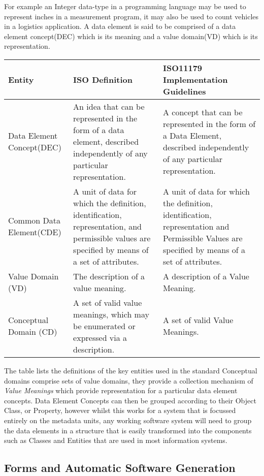 For example an Integer data-type in a programming language may be used
to represent inches in a measurement program, it may also be used to
count vehicles in a logistics application.  A data element is said to
be comprised of a data element concept(DEC) which is its meaning and a
value domain(VD) which is its representation.

\begin{table}[h]
  \begin{tabular}{ p{1.8cm} p{2.8cm}  p{3.0cm}  }  %
    \hline
    Entity & ISO Definition & ISO11179 Implementation Guidelines  \\ 
    \hline
    Data Element Concept(DEC) & An idea that can be represented in the form of a data element, described independently of any particular representation. & A concept that can be represented in the form of a Data Element, described independently of any particular representation.\\
    Common Data Element(CDE) & A unit of data for which the definition, identification, representation, and permissible values are specified by means of a set of attributes. & A unit of data for which the definition, identification, representation and Permissible Values are specified by means of a set of attributes. \\
    Value Domain (VD) & The description of a value meaning. & A description of a Value Meaning. \\
    Conceptual Domain (CD) & A set of valid value meanings, which may be enumerated or expressed via a description.& A set of valid Value Meanings.\\
		\hline
  \end{tabular}
\end{table}

The table lists the definitions of the key entities used in the
standard Conceptual domains comprise sets of value domains, they
provide a collection mechanism of \emph{Value Meanings} which provide
representation for a particular data element concepts. Data Element
Concepts can then be grouped according to their Object Class, or
Property, however whilst this works for a system that is focussed
entirely on the metadata units, any working software system will need
to group the data elements in a structure that is easily transformed
into the components such as Classes and Entities that are used in most
information systems.


\subsection{Forms and Automatic Software Generation}


